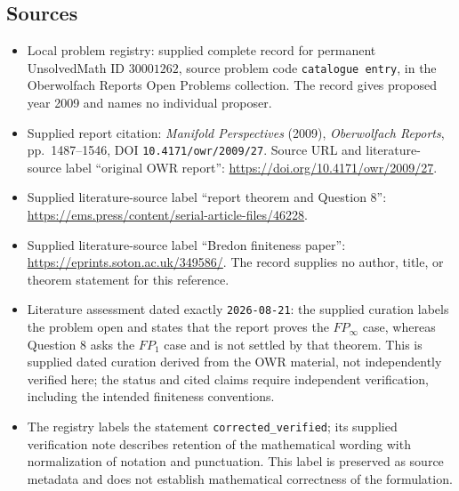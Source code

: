 \documentclass[11pt]{article}
\begin{document}
\subsection{Sources}
\begin{itemize}
\item Local problem registry: supplied complete record for permanent UnsolvedMath ID \(30001262\), source problem code \texttt{catalogue entry}, in the Oberwolfach Reports Open Problems collection. The record gives proposed year 2009 and names no individual proposer.
\item Supplied report citation: \emph{Manifold Perspectives} (2009), \emph{Oberwolfach Reports}, pp.\ 1487--1546, DOI \texttt{10.4171/owr/2009/27}. Source URL and literature-source label ``original OWR report'': \url{https://doi.org/10.4171/owr/2009/27}.
\item Supplied literature-source label ``report theorem and Question 8'': \url{https://ems.press/content/serial-article-files/46228}.
\item Supplied literature-source label ``Bredon finiteness paper'': \url{https://eprints.soton.ac.uk/349586/}. The record supplies no author, title, or theorem statement for this reference.
\item Literature assessment dated exactly \texttt{2026-08-21}: the supplied curation labels the problem open and states that the report proves the \(FP_\infty\) case, whereas Question 8 asks the \(FP_1\) case and is not settled by that theorem. This is supplied dated curation derived from the OWR material, not independently verified here; the status and cited claims require independent verification, including the intended finiteness conventions.
\item The registry labels the statement \texttt{corrected\_verified}; its supplied verification note describes retention of the mathematical wording with normalization of notation and punctuation. This label is preserved as source metadata and does not establish mathematical correctness of the formulation.
\end{itemize}
\end{document}

